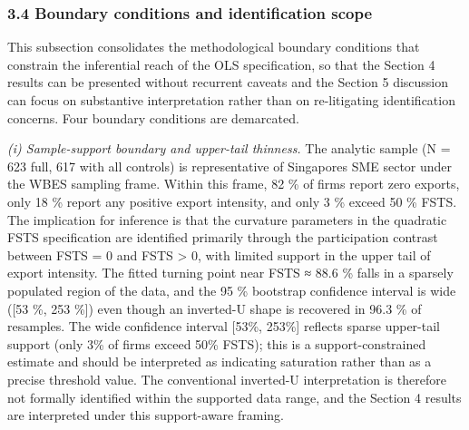 \documentclass[12pt,a4paper]{article}
\begin{document}
\hypertarget{34-boundary-conditions-and-identification-scope}{%
\subsubsection{3.4 Boundary conditions and identification
scope}\label{34-boundary-conditions-and-identification-scope}}

This subsection consolidates the methodological boundary conditions that
constrain the inferential reach of the OLS specification, so that the
Section 4 results can be presented without recurrent caveats and the
Section 5 discussion can focus on substantive interpretation rather than
on re-litigating identification concerns. Four boundary conditions are
demarcated.

\emph{(i) Sample-support boundary and upper-tail thinness.} The analytic
sample (N = 623 full, 617 with all controls) is representative of
Singapore\textquotesingle s SME sector under the WBES sampling frame.
Within this frame, 82 \% of firms report zero exports, only 18 \% report
any positive export intensity, and only 3 \% exceed 50 \% FSTS. The
implication for inference is that the curvature parameters in the
quadratic FSTS specification are identified primarily through the
participation contrast between FSTS = 0 and FSTS \textgreater{} 0, with
limited support in the upper tail of export intensity. The fitted
turning point near FSTS ≈ 88.6 \% falls in a sparsely populated region
of the data, and the 95 \% bootstrap confidence interval is wide ({[}53
\%, 253 \%{]}) even though an inverted-U shape is recovered in 96.3 \%
of resamples. The wide confidence interval {[}53\%, 253\%{]} reflects
sparse upper-tail support (only 3\% of firms exceed 50\% FSTS); this is
a support-constrained estimate and should be interpreted as indicating
saturation rather than as a precise threshold value. The conventional
inverted-U interpretation is therefore not formally identified within
the supported data range, and the Section 4 results are interpreted
under this support-aware framing.
\end{document}
